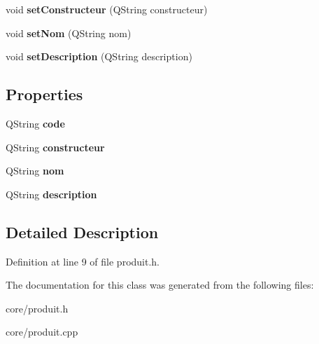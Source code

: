 \begin{DoxyCompactItemize}
\item 
\hypertarget{class_produit_a1301bb612ce0c2c40a03c411c6ba12d9}{
void {\bfseries setConstructeur} (QString constructeur)}
\label{da/db9/class_produit_a1301bb612ce0c2c40a03c411c6ba12d9}

\item 
\hypertarget{class_produit_a8747759c26177afeecb116873e39cacc}{
void {\bfseries setNom} (QString nom)}
\label{da/db9/class_produit_a8747759c26177afeecb116873e39cacc}

\item 
\hypertarget{class_produit_a31c004da80561f48e4542db30a584060}{
void {\bfseries setDescription} (QString description)}
\label{da/db9/class_produit_a31c004da80561f48e4542db30a584060}

\end{DoxyCompactItemize}
\subsection*{Properties}
\begin{DoxyCompactItemize}
\item 
\hypertarget{class_produit_a292f9a5ad8f468674fb71500f4eb2e03}{
QString {\bfseries code}}
\label{da/db9/class_produit_a292f9a5ad8f468674fb71500f4eb2e03}

\item 
\hypertarget{class_produit_a6fc171a927753852c8b50590ca63eb35}{
QString {\bfseries constructeur}}
\label{da/db9/class_produit_a6fc171a927753852c8b50590ca63eb35}

\item 
\hypertarget{class_produit_a582becfbc8aef72c99f83a37642cf7a5}{
QString {\bfseries nom}}
\label{da/db9/class_produit_a582becfbc8aef72c99f83a37642cf7a5}

\item 
\hypertarget{class_produit_af13c24a4fbce61179abd1860dd5e7857}{
QString {\bfseries description}}
\label{da/db9/class_produit_af13c24a4fbce61179abd1860dd5e7857}

\end{DoxyCompactItemize}


\subsection{Detailed Description}


Definition at line 9 of file produit.h.



The documentation for this class was generated from the following files:\begin{DoxyCompactItemize}
\item 
core/produit.h\item 
core/produit.cpp\end{DoxyCompactItemize}
